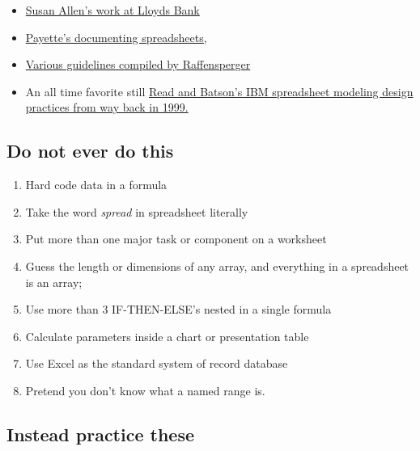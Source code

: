 \documentclass[
]{book}
\begin{document}
\begin{itemize}
\item
  \href{https://arxiv.org/ftp/arxiv/papers/0909/0909.2452.pdf}{Susan Allen's work at Lloyds Bank}
\item
  \href{https://arxiv.org/ftp/arxiv/papers/0803/0803.0165.pdf}{Payette's documenting spreadsheets,}
\item
  \href{https://arxiv.org/ftp/arxiv/papers/0803/0803.0165.pdf}{Various guidelines compiled by Raffensperger}
\item
  An all time favorite still \href{http://www.eusprig.org/smbp.pdf}{Read and Batson's IBM spreadsheet modeling design practices from way back in 1999.}
\end{itemize}

\hypertarget{do-not-ever-do-this}{%
\subsection{Do not ever do this}\label{do-not-ever-do-this}}

\begin{enumerate}
\def\labelenumi{\arabic{enumi}.}
\item
  Hard code data in a formula
\item
  Take the word \emph{spread} in spreadsheet literally
\item
  Put more than one major task or component on a worksheet
\item
  Guess the length or dimensions of any array, and everything in a spreadsheet is an array;
\item
  Use more than 3 IF-THEN-ELSE's nested in a single formula
\item
  Calculate parameters inside a chart or presentation table
\item
  Use Excel as the standard system of record database
\item
  Pretend you don't know what a named range is.
\end{enumerate}

\hypertarget{instead-practice-these}{%
\subsection{Instead practice these}\label{instead-practice-these}}
\end{document}
